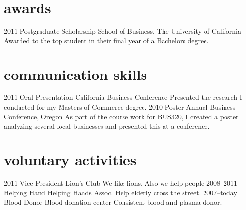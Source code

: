 \documentclass[heros]{friggeri-cv} %
\begin{document}
\section{awards}

\begin{entrylist}
\entry
{2011}
{Postgraduate Scholarship}
{School of Business, The University of California}
{Awarded to the top student in their final year of a Bachelors degree.}
\end{entrylist}



\section{communication skills}

\begin{entrylist}
\entry
{2011}
{Oral Presentation}
{California Business Conference}
{Presented the research I conducted for my Masters of Commerce degree.}
\entry
{2010}
{Poster}
{Annual Business Conference, Oregon}
{As part of the course work for BUS320, I created a poster analyzing several local businesses and presented this at a conference.}
\end{entrylist}



\section{voluntary activities}
\begin{entrylist}
\entry
{2011}
{Vice President}
{Lion's Club}
{We like lions. Also we help people}
\entry
{2008--2011}
{Helping Hand}
{Helping Hands Assoc.}
{Help elderly cross the street.}
\entry
{2007--today}
{Blood Donor}
{Blood donation center}
{Consistent blood and plasma donor.}
\end{entrylist}
\end{document}
